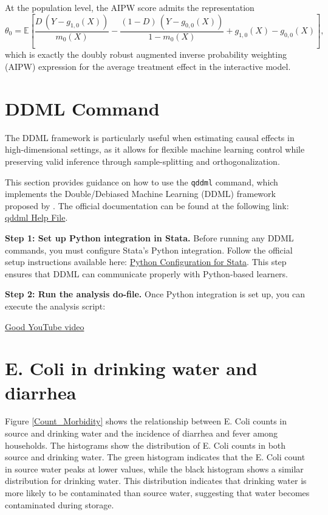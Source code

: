 \documentclass [11pt]{article}
\theoremstyle{plain}
\theoremstyle{definition}
\theoremstyle{remark}
\newcommand{\1}{\bm{1}}
\newcommand{\E}{\mathbb{E}}
\begin{document}
\begin{appendices}
At the population level, the AIPW score admits the representation
\[
\theta_0 = \E\left[ \frac{D\,(Y - g_{1,0}(X))}{m_0(X)} - \frac{(1-D)\,(Y - g_{0,0}(X))}{1 - m_0(X)} + g_{1,0}(X) - g_{0,0}(X) \right],
\]
which is exactly the doubly robust augmented inverse probability weighting (AIPW) expression for the average treatment effect in the interactive model.



\clearpage
\section{DDML Command}\setcounter{figure}{0}\setcounter{table}{0}\label{DDMLCommand}
The DDML framework is particularly useful when estimating causal effects in high-dimensional settings, as it allows for flexible machine learning control while preserving valid inference through sample-splitting and orthogonalization.

This section provides guidance on how to use the \texttt{qddml} command, which implements the Double/Debiased Machine Learning (DDML) framework proposed by \citet{chernozhukov2018double}.  
The official documentation can be found at the following link:  
\href{https://statalasso.github.io/docs/ddml/help/}{qddml Help File}.

\bigskip
\noindent
\textbf{Step 1: Set up Python integration in Stata.}  
Before running any DDML commands, you must configure Stata’s Python integration.  
Follow the official setup instructions available here:  
\href{https://statalasso.github.io/docs/python/}{Python Configuration for Stata}.  
This step ensures that DDML can communicate properly with Python-based learners.

\bigskip
\noindent
\textbf{Step 2: Run the analysis do-file.}  
Once Python integration is set up, you can execute the analysis script:  

\href{https://www.youtube.com/watch?v=iiEi-3gIUbg&t=1706s}{Good YouTube video}

\clearpage
\section{E. Coli in drinking water and diarrhea}  

Figure \ref{Count_Morbidity} shows the relationship between E. Coli counts in source and drinking water and the incidence of diarrhea and fever among households. The histograms show the distribution of E. Coli counts in both source and drinking water. The green histogram indicates that the E. Coli count in source water peaks at lower values, while the black histogram shows a similar distribution for drinking water. This distribution indicates that drinking water is more likely to be contaminated than source water, suggesting that water becomes contaminated during storage.


\end{appendices}
\end{document}
